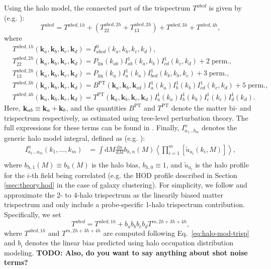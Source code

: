 \documentclass[a4paper,11pt]{article}
\newcommand{\todo}[1]{{\bf TODO: #1}}
\begin{document}
    Using the halo model, the connected part of the trispectrum $T^{abcd}$ is given by (e.g. \cite{Takada:2013}):
    \begin{equation}
      T^{abcd} = T^{abcd, 1h} + (T^{abcd, 2h}_{22} + T^{abcd, 2h}_{13}) + T^{abcd, 3h} + T^{abcd, 4h},
    \end{equation}
    where
    \begin{align}
      &T^{abcd, 1h}(\mathbf{k}_{a}, \mathbf{k}_{b}, \mathbf{k}_{c}, \mathbf{k}_{d}) = I^{0}_{abcd}(k_{a}, k_{b}, k_{c}, k_{d}), \\
      &T^{abcd, 2h}_{22}(\mathbf{k}_{a}, \mathbf{k}_{b}, \mathbf{k}_{c}, \mathbf{k}_{d}) = P_{\mathrm{lin}}(k_{ab})I^{1}_{ab}(k_{a}, k_{b})I^{1}_{cd}(k_{c}, k_{d}) + 2 \; \mathrm{perm.}, \\
      &T^{abcd, 2h}_{13}(\mathbf{k}_{a}, \mathbf{k}_{b}, \mathbf{k}_{c}, \mathbf{k}_{d}) = P_{\mathrm{lin}}(k_{a})I^{1}_{a}(k_{a})I^{1}_{bcd}(k_{b}, k_{b}, k_{c}) + 3 \; \mathrm{perm.}, \\
      &T^{abcd, 3h}(\mathbf{k}_{a}, \mathbf{k}_{b}, \mathbf{k}_{c}, \mathbf{k}_{d}) = B^{\mathrm{PT}}(\mathbf{k}_{a}, \mathbf{k}_{b}, \mathbf{k}_{cd})I^{1}_{a}(k_{a})I^{1}_{b}(k_{b})I^{1}_{cd}(k_{c}, k_{d}) + 5 \; \mathrm{perm.}, \\
      &T^{abcd, 4h}(\mathbf{k}_{a}, \mathbf{k}_{b}, \mathbf{k}_{c}, \mathbf{k}_{d}) = T^{\mathrm{PT}}(\mathbf{k}_{a}, \mathbf{k}_{b}, \mathbf{k}_{c}, \mathbf{k}_{d})I^{1}_{a}(k_{a})I^{1}_{b}(k_{b})I^{1}_{c}(k_{c})I^{1}_{d}(k_{d}).
    \label{eq:halo-mod-trisp}
    \end{align}
    Here, ${\bf k}_{ab}\equiv {\bf k}_a+{\bf k}_b$, and the quantities $B^{\mathrm{PT}}$ and $T^{\mathrm{PT}}$ denote the matter bi- and trispectrum respectively, as estimated using tree-level perturbation theory. The full expressions for these terms can be found in \cite{Takada:2013}. Finally, $I^{n}_{a_1...b_m}$ denotes the generic halo model integral, defined as (e.g. \cite{Krause:2017}):
    \begin{align}
      I^{n}_{a_1...a_m}(k_1,...,k_m) &= \int \mathrm{d}M \frac{\mathrm{d}n}{\mathrm{d}M}b_{h, n}(M)  \left\langle\prod_{i=1}^m \left[\tilde{u}_{a_i}(k_i, M) \right]\right\rangle, \\
    \end{align}
    where $b_{h,1}(M)\equiv b_h(M)$ is the halo bias, $b_{h,0}\equiv1$, and $\tilde{u}_{a_i}$ is the halo profile for the $i$-th field being correlated (e.g. the HOD profile described in Section \ref{ssec:theory.hod} in the case of galaxy clustering). For simplicity, we follow \cite{Krause:2017} and approximate the 2- to 4-halo trispectrum as the linearily biased matter trispectrum and only include a probe-specific 1-halo trispectrum contribution. Specifically, we set 
    \begin{equation}
      T^{abcd} = T^{abcd, 1h} + b_{a}b_{b}b_{c}b_{d}T^{m, 2h+3h+4h},
    \end{equation}
where $T^{abcd, 1h}$ and $T^{m, 2h+3h+4h}$ are computed following Eq.~\ref{eq:halo-mod-trisp} and $b_{i}$ denotes the linear bias predicted using halo occupation distribution modeling. \todo{Also, do you want to say anything about shot noise terms?}
\end{document}
